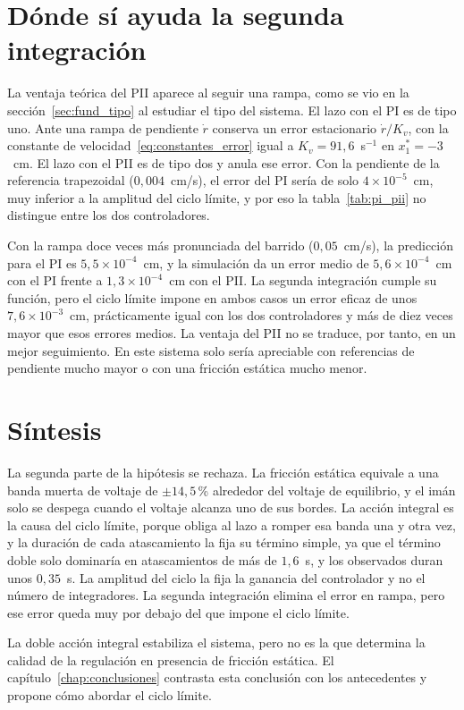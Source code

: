 \section{Dónde sí ayuda la segunda integración}\label{sec:ventaja_rampa}

La ventaja teórica del PII aparece al seguir una rampa, como se vio en la sección~\ref{sec:fund_tipo} al estudiar el tipo del sistema. El lazo con el PI es de tipo uno. Ante una rampa de pendiente $\dot r$ conserva un error estacionario $\dot r/K_v$, con la constante de velocidad~\eqref{eq:constantes_error} igual a $K_v=91{,}6$~s$^{-1}$ en $x_1^*=-3$~cm. El lazo con el PII es de tipo dos y anula ese error. Con la pendiente de la referencia trapezoidal ($0{,}004$~cm/s), el error del PI sería de solo $4\times10^{-5}$~cm, muy inferior a la amplitud del ciclo límite, y por eso la tabla~\ref{tab:pi_pii} no distingue entre los dos controladores.

Con la rampa doce veces más pronunciada del barrido ($0{,}05$~cm/s), la predicción para el PI es $5{,}5\times10^{-4}$~cm, y la simulación da un error medio de $5{,}6\times10^{-4}$~cm con el PI frente a $1{,}3\times10^{-4}$~cm con el PII. La segunda integración cumple su función, pero el ciclo límite impone en ambos casos un error eficaz de unos $7{,}6\times10^{-3}$~cm, prácticamente igual con los dos controladores y más de diez veces mayor que esos errores medios. La ventaja del PII no se traduce, por tanto, en un mejor seguimiento. En este sistema solo sería apreciable con referencias de pendiente mucho mayor o con una fricción estática mucho menor.

\section{Síntesis}\label{sec:sintesis_doble_integral}

La segunda parte de la hipótesis se rechaza. La fricción estática equivale a una banda muerta de voltaje de $\pm14{,}5$\,\% alrededor del voltaje de equilibrio, y el imán solo se despega cuando el voltaje alcanza uno de sus bordes. La acción integral es la causa del ciclo límite, porque obliga al lazo a romper esa banda una y otra vez, y la duración de cada atascamiento la fija su término simple, ya que el término doble solo dominaría en atascamientos de más de $1{,}6$~s, y los observados duran unos $0{,}35$~s. La amplitud del ciclo la fija la ganancia del controlador y no el número de integradores. La segunda integración elimina el error en rampa, pero ese error queda muy por debajo del que impone el ciclo límite.

La doble acción integral estabiliza el sistema, pero no es la que determina la calidad de la regulación en presencia de fricción estática. El capítulo~\ref{chap:conclusiones} contrasta esta conclusión con los antecedentes y propone cómo abordar el ciclo límite.

\FloatBarrier

